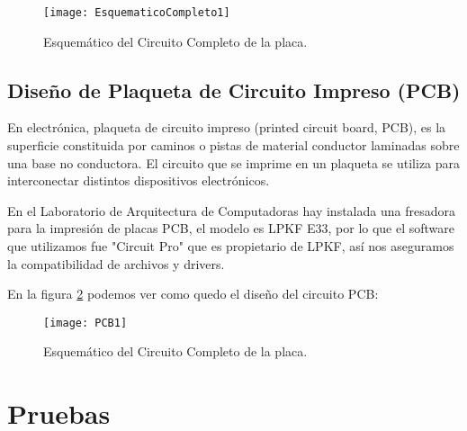 \begin{figure}
\centering
  \texttt{[image: EsquematicoCompleto1]}
  \caption{Esquemático del Circuito Completo de la placa.}\label{fig:EsquematicoCompleto1}
\end{figure}



\subsection{Diseño de Plaqueta de Circuito Impreso (PCB)}
\label{pcb1}

En electrónica, plaqueta de circuito impreso (printed circuit board, PCB), es la superficie constituida por caminos o pistas de material conductor laminadas sobre una base no conductora. El circuito que se imprime en un plaqueta se utiliza para interconectar distintos dispositivos electrónicos.

En el Laboratorio de Arquitectura de Computadoras hay instalada una fresadora para la impresión de placas PCB, el modelo es LPKF E33, por lo que el software que utilizamos fue "Circuit Pro" que es propietario de LPKF, así nos aseguramos la compatibilidad de archivos y drivers.

En la figura \ref{fig:PCB1} podemos ver como quedo el diseño del circuito PCB:

\begin{figure}
\centering
  \texttt{[image: PCB1]}
  \caption{Esquemático del Circuito Completo de la placa.}\label{fig:PCB1}
\end{figure}




\section{Pruebas} %
\label{sec:pruebas}

